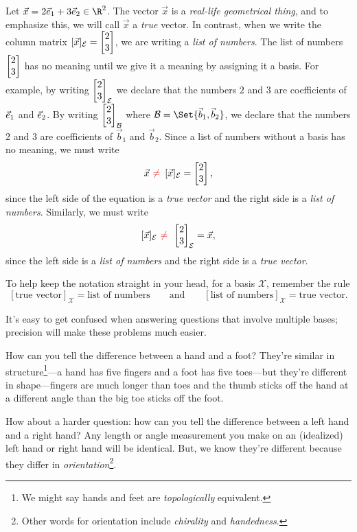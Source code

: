 Let $\vec x=2\xhat+3\yhat\in \R^2$. The vector $\vec x$ is a \emph{real-life geometrical thing}, and to
emphasize this, we will call $\vec x$ a \emph{true} vector. In contrast, when we write
the column matrix $[\vec x]_{\mathcal E}=\mat{2\\3}$, we are writing a \emph{list of numbers}. The list of
numbers $\mat{2\\3}$ has no meaning until we give it a meaning by assigning it a basis. For example,
by writing $\mat{2\\3}_{\mathcal E}$ we declare that the numbers $2$ and $3$ are coefficients of ${\vec e_1}$ and
${\vec e_2}$. By writing $\mat{2\\3}_{\mathcal B}$ where $\mathcal B=\Set{\vec b_1,\vec b_2}$,
we declare that the numbers $2$ and $3$ are coefficients of $\vec b_1$ and $\vec b_2$. Since a list of numbers
without a basis has no meaning, we must write
\[
	\vec x\,\,{\color{Red}\neq}\,\,\, [\vec x]_{\mathcal E}=\mat{2\\3},
\]
since the left side of the equation is a \emph{true vector} and the right side is a \emph{list of numbers}. Similarly,
we must write
\[
	[\vec x]_{\mathcal E}\,\,{\color{Red}\neq}\,\,\, \mat{2\\3}_{\mathcal E}=\vec x,
\]
since the left side is a \emph{list of numbers} and the right side is a \emph{true vector}.

To help keep the notation straight in your head, for a basis $\mathcal X$, remember the rule
\[
	[\text{true vector}]_{\mathcal X} = \text{list of numbers}\qquad\text{and}\qquad
	[\text{list of numbers}]_{\mathcal X} =\text{true vector}.
\]

It's easy to get confused when answering questions that involve multiple bases; precision will
make these problems much easier.

How can you tell the difference between a hand and a foot? They're similar in structure\footnote{ We might
say hands and feet are \emph{topologically} equivalent.}---a hand has five
fingers and a foot has five toes---but they're different in shape---fingers are much longer than toes and the thumb sticks off
the hand at a different angle than the big toe sticks off the foot.

How about a harder question: how can you tell the difference between a left hand and a right hand? Any length
or angle measurement you make on an (idealized) left hand or right hand will be identical. But, we know they're different
because they differ in \emph{orientation}\footnote{ Other words for orientation include \emph{chirality} and \emph{handedness}.}.

